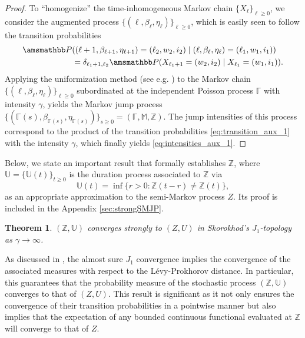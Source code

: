 \documentclass[11pt,leqno]{amsart}
\numberwithin{table}{section}
\numberwithin{figure}{section}
\numberwithin{equation}{section}
\newcommand{\1}{{\mathds{1}}}
\newcommand{\0}{\mat{0}}
\renewcommand{\P }{{\amsmathbb P}}
\newtheorem{theorem}[lemma]{Theorem}
\newcommand{\ap}[1]{\mathbb{#1}}
\begin{document}
\begin{proof}
To ``homogenize'' the time-inhomogeneous Markov chain $\{X_\ell\}_{\ell\ge 0}$, we consider the augmented process $\{(\ell,\beta_\ell,\eta_\ell)\}_{\ell\ge 0}$, which is easily seen to follow the transition probabilities
\begin{align}
\P&((\ell+1,\beta_{\ell+1},\eta_{\ell+1})=(\ell_2, w_2,i_2)\mid (\ell,\beta_\ell,\eta_\ell)=(\ell_1,w_1,i_1))\nonumber\\
& = \delta_{\ell_1+1,\ell_2}\P(X_{\ell_1+1}=(w_2,i_2)\mid X_{\ell_1}=(w_1,i_1)).\label{eq:transition_aux_1}
\end{align}
Applying the uniformization method (see e.g. \cite{van2018uniformization}) to the Markov chain $\{(\ell,\beta_\ell,\eta_\ell)\}_{\ell\ge 0}$ subordinated at the independent Poisson process $\ap{\Gamma}$ with intensity $\gamma$, yields the Markov jump process $\{(\ap{\Gamma}(s),\beta_{\ap{\Gamma}(s)},\eta_{\ap{\Gamma}(s)})\}_{s\ge 0}= (\ap{\Gamma}, \ap{M}, \ap{Z})$. The jump intensities of this process correspond to the product of the transition probabilities \eqref{eq:transition_aux_1} with the intensity $\gamma$, which finally yields \eqref{eq:intensities_aux_1}.
\end{proof}

Below, we state an important result that formally establishes {$\ap{Z}$}, where $\ap{U}=\{\ap{U}(t)\}_{t\ge 0}$ is the duration process associated to $\ap{Z}$ via 
\begin{equation}\label{eq:Uapp6}\ap{U}(t)=\inf\{r>0: \ap{Z}(t-r)\neq \ap{Z}(t)\},\end{equation} as an appropriate approximation to the semi-Markov process $Z$. Its proof is included in the Appendix \ref{sec:strongSMJP}.

\begin{theorem}\label{th:strong_simp}
$(\ap{Z},\ap{U})$ converges strongly to $(Z,U)$ in Skorokhod's $J_1$-topology as $\gamma\rightarrow\infty$.
\end{theorem}

As discussed in \cite[Lemma 1.2]{prokhorov1956convergence}, the almost sure $J_1$ convergence implies the convergence of the associated measures with respect to the L\'evy-Prokhorov distance. In particular, this guarantees that the probability measure of the stochastic process $(\ap{Z},\ap{U})$ converges to that of $(Z,U)$. This result is significant as it not only ensures the convergence of their transition probabilities in a pointwise manner but also implies that the expectation of any bounded continuous functional evaluated at $\ap{Z}$ will converge to that of $Z$.
\end{document}
